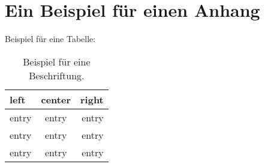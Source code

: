 \chapter{Ein Beispiel für einen Anhang}

Beispiel für eine Tabelle:

\begin{table}[htbp]
  \begin{center}
    \begin{tabular}{lcr}
      \hline
      left & center & right\\
      \hline
      entry & entry & entry \\
      entry & entry & entry \\
      entry & entry & entry \\
      \hline
    \end{tabular}
    \caption{Beispiel für eine Beschriftung.}
    \label{tab:ToRef}
  \end{center}
\end{table}

